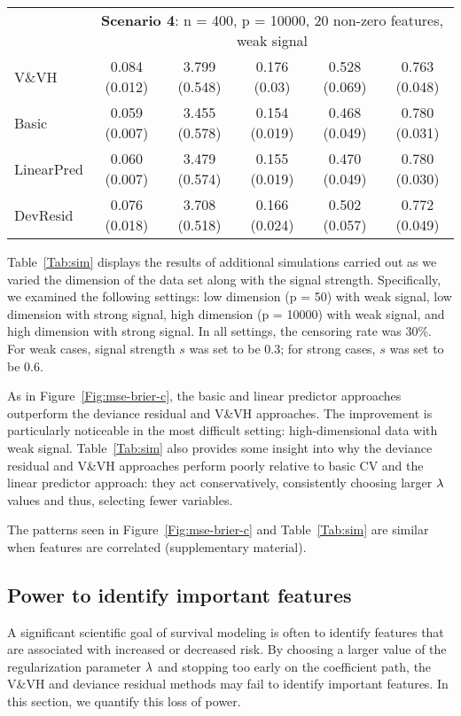 \begin{table}[!htb]
\begin{tabular}[t]{lccccc}
&\multicolumn{5}{c}{\textbf{Scenario 4}: n = 400, p = 10000, 20 non-zero features, weak signal}\\
\cline{2-6}
V\&VH  & 0.084 (0.012) & 3.799 (0.548) & 0.176 (0.03) & 0.528 (0.069) & 0.763 (0.048) \\
Basic  & 0.059 (0.007) & 3.455 (0.578) & 0.154 (0.019) & 0.468 (0.049) & 0.780 (0.031) \\
LinearPred  & 0.060 (0.007) & 3.479 (0.574) & 0.155 (0.019) & 0.470 (0.049) & 0.780 (0.030) \\
DevResid  & 0.076 (0.018) & 3.708 (0.518) & 0.166 (0.024) & 0.502 (0.057) & 0.772 (0.049) \\
\bottomrule
\end{tabular}
\end{table}

Table~\ref{Tab:sim} displays the results of additional simulations carried out as we varied the dimension of the data set along with the signal strength.  Specifically, we examined the following settings: low dimension (p = 50) with weak signal, low dimension with strong signal, high dimension (p = 10000) with weak signal, and high dimension with strong signal. In all settings, the censoring rate was 30\%. For weak cases, signal strength $s$ was set to be 0.3; for strong cases, $s$ was set to be 0.6. 

As in Figure~\ref{Fig:mse-brier-c}, the basic and linear predictor approaches outperform the deviance residual and V\&VH approaches.  The improvement is particularly noticeable in the most difficult setting: high-dimensional data with weak signal.  Table~\ref{Tab:sim} also provides some insight into why the deviance residual and V\&VH approaches perform poorly relative to basic CV and the linear predictor approach: they act conservatively, consistently choosing larger $\lambda$ values and thus, selecting fewer variables.

The patterns seen in Figure~\ref{Fig:mse-brier-c} and Table~\ref{Tab:sim} are similar when features are correlated (supplementary material).

\subsection{Power to identify important features}
\label{Sec:power}

A significant scientific goal of survival modeling is often to identify features that are associated with increased or decreased risk. By choosing a larger value of the regularization parameter $\lambda$ and stopping too early on the coefficient path, the V\&VH and deviance residual methods may fail to identify important features. In this section, we quantify this loss of power.

